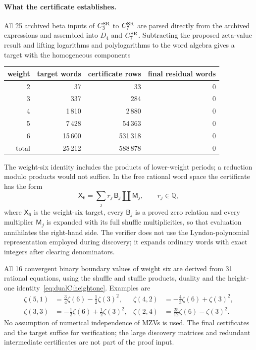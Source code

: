 \documentclass[11pt,a4paper]{article}
\numberwithin{equation}{section}
\newcommand{\CSR}{C^{\rm SR}}
\begin{document}
\paragraph{What the certificate establishes.} All 25 archived beta inputs of $\CSR_3$ to $\CSR_7$ are parsed
directly from the archived expressions and assembled into $D_4$ and $\CSR_7$. Subtracting the proposed zeta-value result and lifting
logarithms and polylogarithms to the word algebra gives a target with the homogeneous components
\begin{center}\small
\begin{tabular}{@{}rrrr@{}}
\toprule
weight & target words & certificate rows & final residual words\\
\midrule
2 & 37 & 33 & 0\\
3 & 337 & 284 & 0\\
4 & 1\,810 & 2\,880 & 0\\
5 & 7\,428 & 54\,363 & 0\\
6 & 15\,600 & 531\,318 & 0\\
\midrule
total & 25\,212 & 588\,878 & 0\\
\bottomrule
\end{tabular}
\end{center}
The weight-six identity includes the products of lower-weight periods; a reduction modulo products would not suffice.
In the free rational word space the certificate has the form
\begin{equation}
 \mathsf X_6=\sum_jr_j\,\mathsf B_j\mathbin{\amalg}\mathsf M_j,\qquad r_j\in\mathbb Q,
\end{equation}
where $\mathsf X_6$ is the weight-six target, every $\mathsf B_j$ is a proved zero relation and every multiplier
$\mathsf M_j$ is expanded with its full shuffle multiplicities, so that evaluation annihilates the right-hand side. The
verifier does not use the Lyndon-polynomial representation employed during discovery; it expands ordinary words with
exact integers after clearing denominators.

All 16 convergent binary boundary values of weight six are derived from 31 rational equations, using the shuffle and
stuffle products, duality and the height-one identity~\eqref{eq:dualC:heightone}. Examples are
\begin{equation}
\begin{aligned}
 \zeta(5,1)&=\tfrac34\zeta(6)-\tfrac12\zeta(3)^2, & \zeta(4,2)&=-\tfrac43\zeta(6)+\zeta(3)^2,\\
 \zeta(3,3)&=-\tfrac12\zeta(6)+\tfrac12\zeta(3)^2, & \zeta(2,4)&=\tfrac{25}{12}\zeta(6)-\zeta(3)^2.
\end{aligned}
\end{equation}
No assumption of numerical independence of MZVs is used. The final certificates and the target suffice for
verification; the large discovery matrices and redundant intermediate certificates are not part of the proof input.
\end{document}
